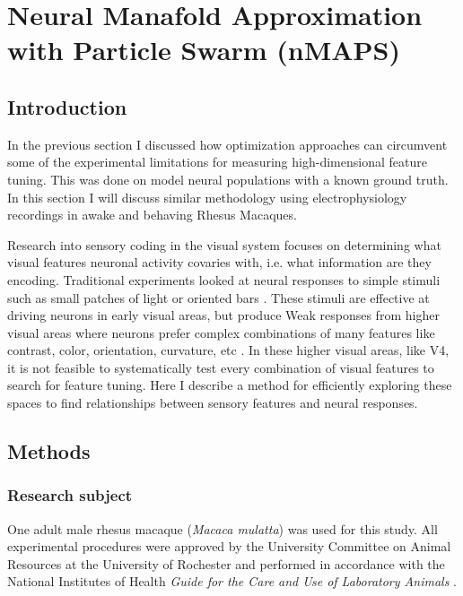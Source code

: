 
\chapter{Neural Manafold Approximation with Particle Swarm (nMAPS)} %

\label{ch:maps} %




\section{Introduction}
In the previous section I discussed how optimization approaches can circumvent some of the experimental limitations for measuring high-dimensional feature tuning. This was done on model neural populations with a known ground truth. In this section I will discuss similar methodology using electrophysiology recordings in awake and behaving Rhesus Macaques.

Research into sensory coding in the visual system focuses on determining what visual features neuronal activity covaries with, i.e. what information are they encoding. Traditional experiments looked at neural responses to simple stimuli such as small patches of light or oriented bars \cite{Hubel1959}. These stimuli are effective at driving neurons in early visual areas, but produce Weak responses from higher visual areas where neurons prefer complex combinations of many features like contrast, color, orientation, curvature, etc \cite{Sani2013,Tanigawa2010, Nandy2016}. In these higher visual areas, like V4, it is not feasible to systematically test every combination of visual features to search for feature tuning. Here I describe a method for efficiently exploring these spaces to find relationships between sensory features and neural responses. 

\section{\color{RoyalBlue!50!black} Methods}
\subsection{Research subject}
One adult male rhesus macaque (\textit{Macaca mulatta}) was used for this study.
All experimental procedures were approved by the University Committee on Animal Resources at the University of Rochester and performed in accordance with the National Institutes of Health \textit{Guide for the Care and Use of Laboratory Animals} \cite{AnimalUse2011}.

